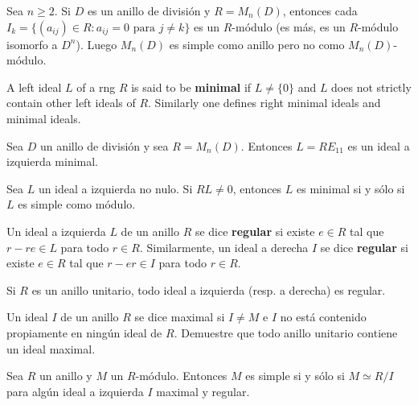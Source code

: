 \begin{example}
	\label{exa:I_k}
	Sea $n\geq2$.  Si $D$ es un anillo de división y $R=M_n(D)$, entonces cada
	$I_k=\{ (a_{ij})\in R:a_{ij}=0\text{ para $j\ne k$}\}$ es un $R$-módulo (es
	más, es un $R$-módulo isomorfo a $D^n$).  Luego $M_{n}(D)$ es simple como
	anillo pero no como $M_n(D)$-módulo.
\end{example}

A left ideal $L$ of a rng $R$ is said to be \textbf{minimal} if $L\ne\{0\}$ and 
$L$ does not strictly contain other left ideals of $R$. Similarly one defines
right minimal ideals and minimal ideals. 

\begin{example}
	Sea $D$ un anillo de división y sea $R=M_n(D)$. Entonces $L=RE_{11}$ es un
	ideal a izquierda minimal.
\end{example}

\begin{example}
	Sea $L$ un ideal a izquierda no nulo. Si $RL\ne0$, entonces
	$L$ es minimal si y sólo si $L$ es simple como módulo.
\end{example}

Un ideal a izquierda $L$ de un anillo $R$ se dice \textbf{regular} si
existe $e\in R$ tal que $r-re\in L$ para todo $r\in R$. 
Similarmente, un ideal a derecha $I$ se dice \textbf{regular} si existe $e\in
R$ tal que $r-er\in I$ para todo $r\in R$.

\begin{remark}
	Si $R$ es un anillo unitario, todo ideal a izquierda (resp. a derecha) es
	regular.
\end{remark}

\begin{exercise}
	Un ideal $I$ de un anillo $R$ se dice maximal si $I\ne M$ e $I$ no está
	contenido propiamente en ningún ideal de $R$.  Demuestre que todo anillo
	unitario contiene un ideal maximal.
\end{exercise}



\begin{proposition}
	\label{proposition:R/I}
	Sea $R$ un anillo y $M$ un $R$-módulo. Entonces $M$ es simple si y sólo si
	$M\simeq R/I$ para algún ideal a izquierda $I$ maximal y regular.		
\end{proposition}

